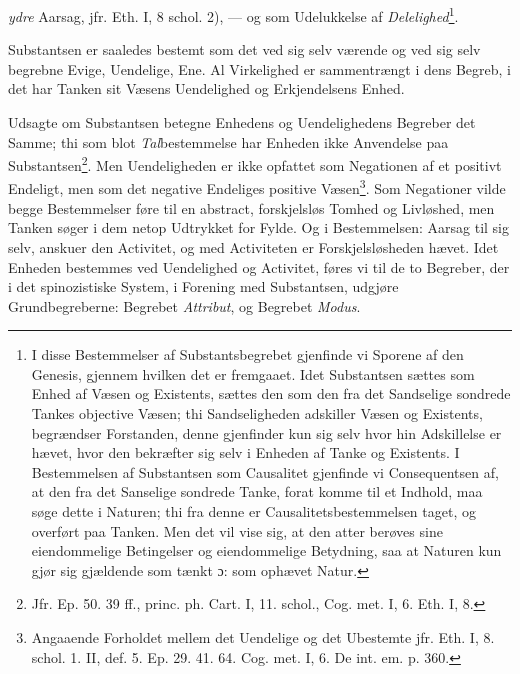 \documentclass[12pt,a4paper]{book}
\newcommand{\opage}[1]{\marginnote{\footnotesize\textit{[#1]}}}
\begin{document}
\emph{ydre} Aarsag, jfr. Eth. I, 8 schol. 2), --- og som Udelukkelse af
\emph{Delelighed}\footnote{I disse Bestemmelser af Substantsbegrebet
gjenfinde vi Sporene af den Genesis, gjennem hvilken det er fremgaaet.
Idet Substantsen sættes som Enhed af Væsen og Existents, sættes den som
den fra det Sandselige sondrede Tankes objective Væsen; thi
Sandseligheden adskiller Væsen og Existents, begrændser Forstanden,
denne gjenfinder kun sig selv hvor hin Adskillelse er hævet, hvor den
bekræfter sig selv i Enheden af Tanke og Existents. I Bestemmelsen af
Substantsen som Causalitet gjenfinde vi Consequentsen af, at den fra
det Sanselige sondrede Tanke, forat komme til et Indhold, maa søge
dette i Naturen; thi fra denne er Causalitetsbestemmelsen taget, og
overført paa Tanken. Men det vil vise sig, at den atter berøves sine
eiendommelige Betingelser og eiendommelige Betydning, saa at Naturen
kun gjør sig gjældende som tænkt ɔ: som ophævet Natur.}.

\opage{46} \setcounter{footnote}{0}%
Substantsen er saaledes bestemt som det ved sig selv værende og ved sig
selv begrebne Evige, Uendelige, Ene. Al Virkelighed er sammentrængt i
dens Begreb, i det har Tanken sit Væsens Uendelighed og Erkjendelsens
Enhed.

Udsagte om Substantsen betegne Enhedens og Uendelighedens Begreber det
Samme; thi som blot \emph{Tal}bestemmelse har Enheden ikke Anvendelse
paa Substantsen\footnote{Jfr. Ep. 50. 39 ff., princ. ph. Cart. I, 11.
schol., Cog. met. I, 6. Eth. I, 8.}. Men Uendeligheden er ikke opfattet
som Negationen af et positivt Endeligt, men som det negative Endeliges
positive Væsen\footnote{Angaaende Forholdet mellem det Uendelige og det
Ubestemte jfr. Eth. I, 8. schol. 1. II, def. 5. Ep. 29. 41. 64. Cog.
met. I, 6. De int. em. p. 360.}. Som Negationer vilde begge
Bestemmelser føre til en abstract, forskjelsløs Tomhed og Livløshed,
men Tanken søger i dem netop Udtrykket for Fylde. Og i Bestemmelsen:
Aarsag til sig selv, anskuer den Activitet, og med Activiteten er
Forskjelsløsheden hævet. Idet Enheden bestemmes ved Uendelighed og
Activitet, føres vi til de to Begreber, der i det spinozistiske
System, i Forening med Substantsen, udgjøre Grundbegreberne: Begrebet
\emph{Attribut}, og Begrebet \emph{Modus}.
\end{document}
